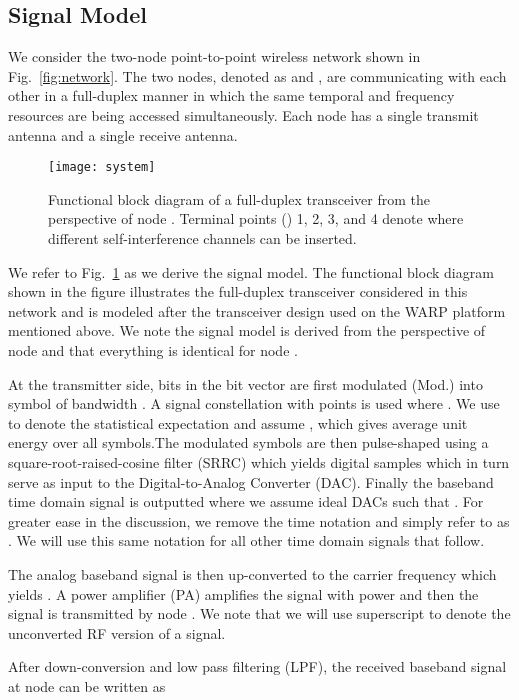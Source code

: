 \documentclass[12pt, journal,draftcls,letterpaper,onecolumn]{IEEEtran}
\begin{document}
\subsection{Signal Model}
\label{subsec:signal_model}
We consider the two-node point-to-point wireless network shown in Fig.~\ref{fig:network}.  The two nodes, denoted as  and , are communicating with each other in a full-duplex manner in which the same temporal and frequency resources are being accessed simultaneously.  Each node has a single transmit antenna and a single receive antenna.  
\begin{figure}[htp] 
\begin{center} 
\texttt{[image: system]}
\caption[fig:system]{Functional block diagram of a full-duplex transceiver from the perspective of node .  Terminal points () 1, 2, 3, and 4 denote where different self-interference channels  can be inserted.} 
  \label{fig:system}
\end{center} 
\end{figure} 
We refer to Fig.~\ref{fig:system} as we derive the signal model.  The functional block diagram shown in the figure illustrates the full-duplex transceiver considered in this network and is modeled after the transceiver design used on the WARP platform mentioned above. We note the signal model is derived from the perspective of node  and that everything is identical for node .  

At the transmitter side,  bits in the  bit vector  are first modulated (Mod.) into symbol  of bandwidth .  A signal constellation with  points is used where .  We use  to denote the statistical expectation and assume , which gives average unit energy over all symbols.The modulated symbols are then pulse-shaped using a square-root-raised-cosine filter (SRRC) which yields digital samples  which in turn serve as input to the Digital-to-Analog Converter (DAC).  Finally the baseband time domain signal  is outputted where we assume ideal DACs such that .  For greater ease in the discussion, we remove the time notation  and simply refer to  as .  We will use this same notation for all other time domain signals that follow.  

The analog baseband signal is then up-converted to the carrier frequency  which yields .  A power amplifier (PA) amplifies the signal with power  and then the signal is transmitted by node .  We note that we will use superscript  to denote the unconverted RF version of a signal.

After down-conversion and low pass filtering (LPF), the received baseband signal at node  can be written as 
\end{document}
